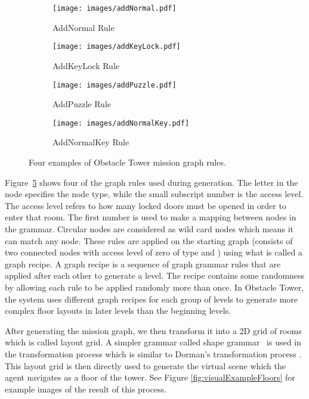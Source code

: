 \documentclass{article}
\begin{document}
\begin{figure}
    \begin{subfigure}[b]{0.4\linewidth}
        \centering
        \texttt{[image: images/addNormal.pdf]}
        \caption{AddNormal Rule}
        \label{fig:addNormal}
    \end{subfigure}
    \begin{subfigure}[b]{0.6\linewidth}
        \centering
        \texttt{[image: images/addKeyLock.pdf]}
        \caption{AddKeyLock Rule}
        \label{fig:addKeyLock}
    \end{subfigure}
    \begin{subfigure}[b]{0.45\linewidth}
        \centering
        \texttt{[image: images/addPuzzle.pdf]}
        \caption{AddPuzzle Rule}
        \label{fig:addPuzzle}
    \end{subfigure}
    \begin{subfigure}[b]{0.45\linewidth}
        \centering
        \texttt{[image: images/addNormalKey.pdf]}
        \caption{AddNormalKey Rule}
        \label{fig:addNormalKey}
    \end{subfigure}
\caption{Four examples of Obstacle Tower mission graph rules.}
    \label{fig:otGrammarRules}
\end{figure}

Figure~\ref{fig:otGrammarRules} shows four of the graph rules used during generation. The letter in the node specifies the node type, while the small subscript number is the access level. The access level refers to how many locked doors must be opened in order to enter that room. The first number is used to make a mapping between nodes in the grammar. Circular nodes are considered as wild card nodes which means it can match any node. These rules are applied on the starting graph (consists of two connected nodes with access level of zero of type  and ) using what is called a graph recipe. A graph recipe is a sequence of graph grammar rules that are applied after each other to generate a level. The recipe contains some randomness by allowing each rule to be applied randomly more than once. In Obstacle Tower, the system uses different graph recipes for each group of levels to generate more complex floor layouts in later levels than the beginning levels.



After generating the mission graph, we then transform it into a 2D grid of rooms which is called layout grid. A simpler grammar called shape grammar~\cite{stiny1971shape} is used in the transformation process which is similar to Dorman's transformation process \cite{dormans2010adventures}. This layout grid is then directly used to generate the virtual scene which the agent navigates as a floor of the tower. See Figure \ref{fig:visualExampleFloors} for example images of the result of this process. 
\end{document}
